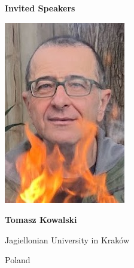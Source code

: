 \documentclass[a3paper, 12pt]{article}
\newcommand*\nfont{\fontsize{16}{19}\selectfont}
\begin{document}
\hfill
\begin{minipage}[t]{.43\linewidth}
  \nfont%
  \hfill {\Large \bf Invited Speakers}

  \medskip

  \begin{minipage}{.2\linewidth}
    \includegraphics[width=\linewidth, trim=0 30 0 0, clip]{kowalski2}
  \end{minipage}
  \hfill
  \begin{minipage}{.75\linewidth}
    \textbf{Tomasz Kowalski}

    Jagiellonian University in Kraków

    Poland
  \end{minipage}

  \medskip


\end{minipage}
\end{document}
